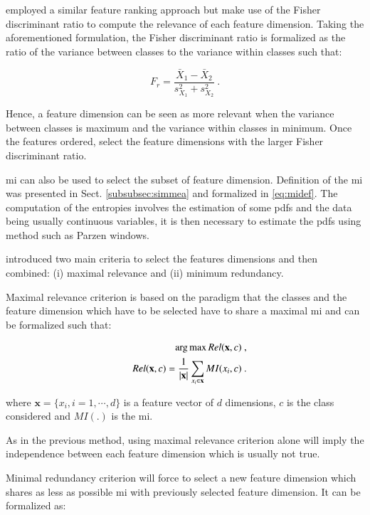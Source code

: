 \cite{Vos2012} employed a similar feature ranking approach but make use of the Fisher discriminant ratio to compute the relevance of each feature dimension. Taking the aforementioned formulation, the Fisher discriminant ratio is formalized as the ratio of the variance between classes to the variance within classes such that:

\begin{equation}
F_r = \frac{\bar{X}_1 - \bar{X}_2}{s^{2}_{X_1}+s^{2}_{X_2}} \ .
\label{eq:fisherratio}
\end{equation}

Hence, a feature dimension can be seen as more relevant when the variance between classes is maximum and the variance within classes in minimum. Once the features ordered, \cite{Vos2012} select the feature dimensions with the larger Fisher discriminant ratio.

\ac{mi} can also be used to select the subset of feature dimension. Definition of the \ac{mi} was presented in Sect. \ref{subsubsec:simmea} and formalized in \ref{eq:midef}. The computation of the entropies involves the estimation of some \acp{pdf} and the data being usually continuous variables, it is then necessary to estimate the \acp{pdf} using method such as Parzen windows.

\cite{Peng2005} introduced two main criteria to select the features dimensions and then combined: (i) maximal relevance and (ii) minimum redundancy.

Maximal relevance criterion is based on the paradigm that the classes and the feature dimension which have to be selected have to share a maximal \ac{mi} and can be formalized such that:

\begin{eqnarray}
	&&\operatorname*{arg\,max} Rel(\mathbf{x},c) \ , \nonumber \\
	&& Rel(\mathbf{x},c) = \frac{1}{|\mathbf{x}|} \sum_{x_i \in \mathbf{x}} MI(x_i,c)  \ . \label{eq:mRel}
\end{eqnarray}

\noindent where $\mathbf{x} = \{x_i,i=1,\cdots,d\}$ is a feature vector of $d$ dimensions, $c$ is the class considered and $MI(.)$ is the \ac{mi}.

As in the previous method, using maximal relevance criterion alone will imply the independence between each feature dimension which is usually not true.

Minimal redundancy criterion will force to select a new feature dimension which shares as less as possible \ac{mi} with previously selected feature dimension. It can be formalized as:

